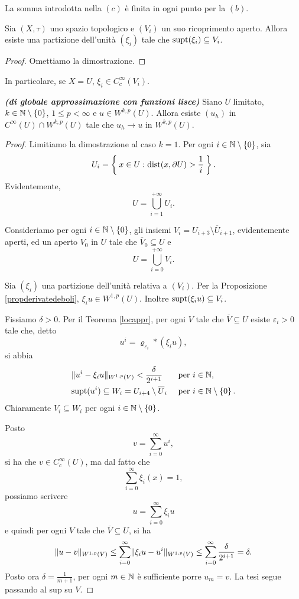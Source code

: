 \begin{osservazione}
	La somma introdotta nella $(c)$ è finita in ogni punto per la $(b)$.
\end{osservazione}

\begin{proposizione}
	Sia $(X,\tau)$ uno spazio topologico e $(V_i)$ un suo ricoprimento aperto. Allora esiste una partizione dell'unità $(\xi_i)$ tale che $\textup{supt}(\xi_i) \subseteq V_i$.
\end{proposizione}
\begin{proof}
	Omettiamo la dimostrazione.
\end{proof}

In particolare, se $X = U$, $\xi_i \in C^\infty_c(V_i)$.

\begin{teorema}\emph{\textbf{(di globale approssimazione con funzioni lisce)}}\label{globappr}
	Siano $U$ limitato, $k \in \mathbb{N}\setminus\left\lbrace 0\right\rbrace $, $1\le p < \infty$ e $u \in W^{k,p}(U)$. Allora esiste $(u_h)$ in $C^\infty(U) \cap W^{k,p}(U)$ tale che $u_h \to u$ in $W^{k,p}(U)$.
\end{teorema}
\begin{proof}
	Limitiamo la dimostrazione al caso $k=1$. Per ogni $i \in \mathbb{N}\setminus \left\lbrace 0\right\rbrace  $, sia
	\[ U_i = \Set{ x \in U: \textup{dist}(x,\partial U) >\frac{1}{i}}. \]
	Evidentemente,
	\[  U = \bigcup_{i=1}^{+\infty} U_i.\]
	
	Consideriamo per ogni $i \in \mathbb{N}\setminus \left\lbrace 0\right\rbrace  $, gli insiemi $V_i = U_{i+3} \setminus \overline{U}_{i+1}$, evidentemente aperti, ed un aperto $V_0$ in $U$ tale che $\overline{V}_0 \subseteq U$ e
	\[ U =  \bigcup_{i=0}^{+\infty} V_i.\]
	
	Sia $(\xi_i)$ una partizione dell'unità relativa a $(V_i)$. Per la Proposizione \eqref{propderivatedeboli}, $\xi_iu \in W^{1,p}(U)$. Inoltre $\textup{supt}(\xi_iu) \subseteq V_i$.
	
	Fissiamo $\delta > 0$. Per il Teorema \eqref{locappr}, per ogni $V$ tale che $\overline{V} \subseteq U$ esiste $\varepsilon_i > 0$ tale che, detto
	\[ u^i = \varrho_{\varepsilon_{i}} \ast (\xi_i u), \]
	si abbia
	\begin{align*}
		&\lVert u^i - \xi_iu\rVert_{W^{1,p}(V)} < \frac{\delta}{2^{i+1}}  & \textup{ per } i &\in \mathbb{N}, \\
		&\textup{supt}(u^i) \subseteq W_i = U_{i+4} \setminus \overline{U}_{i} & \textup{ per } i &\in \mathbb{N}\setminus\left\lbrace 0\right\rbrace.
	\end{align*}
	Chiaramente $V_i \subseteq W_i $ per ogni $i \in \mathbb{N}\setminus\left\lbrace 0\right\rbrace$.
	
	Posto 
	\[ v = \sum_{i=0}^{\infty} u^i, \]
	si ha che $v \in C^\infty_c(U)$, ma dal fatto che 
	\[ \sum_{i=0}^\infty \xi_i(x) = 1, \]
	possiamo scrivere 
	\[ u = \sum_{i=0}^\infty \xi_i u \]
	e quindi per ogni $V$ tale che $\overline{V}\subseteq U$, si ha
	\[ \lVert u-v\rVert_{W^{1,p}(V)} \le \sum_{i=0}^\infty \lVert\xi_iu-u^i\rVert_{W^{1,p}(V)} \le \sum_{i=0}^\infty \frac{\delta}{2^{i+1}} = \delta. \]
	Posto ora $\delta = \frac{1}{m+1}$, per ogni $m \in \mathbb{N}$ è sufficiente porre $u_m = v.$ La tesi segue passando al sup su $V$. 
\end{proof}

